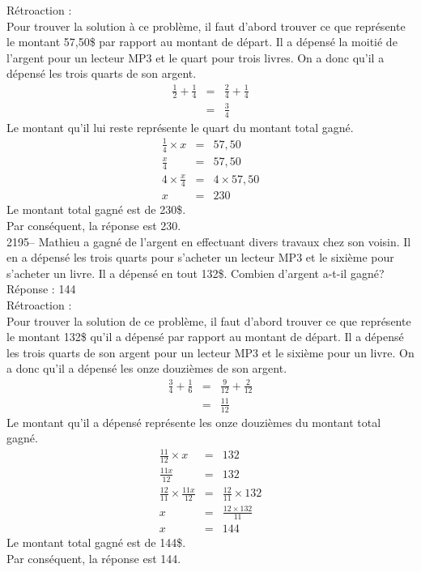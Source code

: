 \documentclass[letterpaper, 12pt]{article}
\begin{document}
R\'etroaction :\\
Pour trouver la solution \`a ce probl\`eme, il faut d'abord trouver ce que repr\'esente le montant 57,50\$ par rapport au montant de d\'epart. Il a d\'epens\'e la moiti\'e de l'argent pour un lecteur MP3 et le quart pour trois livres. On a donc qu'il a d\'epens\'e les trois quarts de son argent.
\begin{eqnarray*}
 \frac{1}{2}+\frac{1}{4}&=&\frac{2}{4}+\frac{1}{4}\\[2mm]
&=&\frac{3}{4}
\end{eqnarray*}
Le montant qu'il lui reste repr\'esente le quart du montant total gagn\'e.
\begin{eqnarray*}
 \frac{1}{4}\times x &=&57,50\\[2mm]
\frac{x}{4}&=&57,50\\[2mm]
4\times\frac{x}{4}&=&4\times57,50\\[2mm]
x&=&230
\end{eqnarray*}
Le montant total gagn\'e est de 230\$.\\
Par cons\'equent, la r\'eponse est 230.\\

2195-- Mathieu a gagn\'e de l'argent en effectuant divers travaux chez son voisin. Il en a d\'epens\'e les trois quarts pour s'acheter un lecteur MP3 et le sixi\`eme pour s'acheter un livre. Il a d\'epens\'e en tout 132\$. Combien d'argent a-t-il gagn\'e?\\

R\'eponse : 144\\

R\'etroaction :\\
Pour trouver la solution de ce probl\`eme, il faut d'abord trouver ce que repr\'esente le montant 132\$ qu'il a d\'epens\'e par rapport au montant de d\'epart. Il a d\'epens\'e les trois quarts de son argent pour un lecteur MP3 et le sixi\`eme pour un livre. On a donc qu'il a d\'epens\'e les onze douzi\`emes de son argent.
\begin{eqnarray*}
 \frac{3}{4}+\frac{1}{6}&=&\frac{9}{12}+\frac{2}{12}\\[2mm]
&=&\frac{11}{12}
\end{eqnarray*}
Le montant qu'il a d\'epens\'e repr\'esente les onze douzi\`emes du montant total gagn\'e.
\begin{eqnarray*}
 \frac{11}{12}\times x&=&132\\[2mm]
\frac{11x}{12}&=&132\\[2mm]
\frac{12}{11}\times\frac{11x}{12}&=&\frac{12}{11}\times132\\[2mm]
x&=&\frac{12\times132}{11}\\[2mm]
x&=&144
\end{eqnarray*}
Le montant total gagn\'e est de 144\$.\\
Par cons\'equent, la r\'eponse est 144.\\
\end{document}
